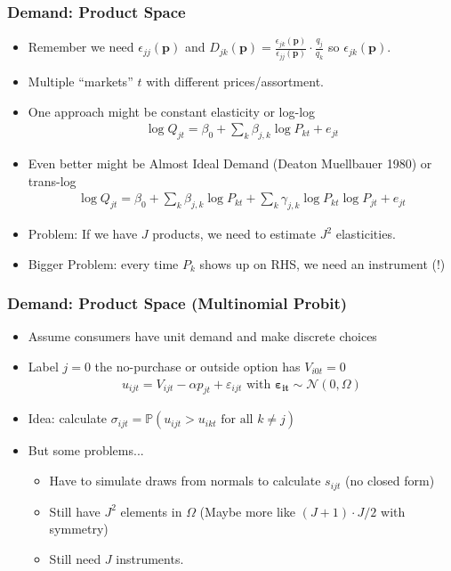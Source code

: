 \begin{frame}
\frametitle{Demand: Product Space}
\begin{itemize}
    \item Remember we need $\epsilon_{jj}(\mathbf{p})$ and $D_{jk}(\mathbf{p}) = \frac{\epsilon_{jk}(\mathbf{p})}{\epsilon_{jj}(\mathbf{p})}\cdot \frac{q_j}{q_k}$ so $\epsilon_{jk}(\mathbf{p})$.
    \item Multiple ``markets'' $t$ with different prices/assortment.
    \item One approach might be \alert{constant elasticity} or \alert{log-log}
    \begin{align*}
        \log Q_{jt} = \beta_0 + \sum_{k} \beta_{j,k} \log P_{kt} + e_{jt}
    \end{align*}
    \item Even better might be \alert{Almost Ideal Demand} (Deaton Muellbauer 1980) or \alert{trans-log}
    \begin{align*}
        \log Q_{jt} = \beta_0 + \sum_{k} \beta_{j,k} \log P_{kt} + \sum_{k} \gamma_{j,k} \log P_{kt} \log P_{jt} +  e_{jt}
    \end{align*}
    \item Problem: If we have $J$ products, we need to estimate $J^2$ elasticities.
    \item Bigger Problem: every time $P_k$ shows up on RHS, we need an instrument (!)
\end{itemize}
\end{frame}

\begin{frame}
\frametitle{Demand: Product Space (Multinomial Probit)}

\begin{itemize}
    \item Assume consumers have unit demand and make discrete choices
    \item Label $j=0$ the no-purchase or outside option has $V_{i0t}=0$
    \begin{align*}
        u_{ijt} = V_{ijt} - \alpha p_{jt} +  \varepsilon_{ijt} \text{ with } \boldsymbol{\varepsilon_{it}} \sim \mathcal{N}(0,\Omega)
    \end{align*}
    \item Idea: calculate $\sigma_{ijt} = \mathbb{P}(u_{ijt} > u_{ikt} \text{ for all } k \neq j)$
    \item But some problems...
    \begin{itemize}
        \item Have to \alert{simulate draws from normals} to calculate $s_{ijt}$ (no closed form)
        \item Still have $J^2$ elements in $\Omega$ (Maybe more like $(J+1) \cdot J / 2$ with symmetry)
        \item Still need $J$ instruments.
    \end{itemize}

\end{itemize}
\end{frame}



